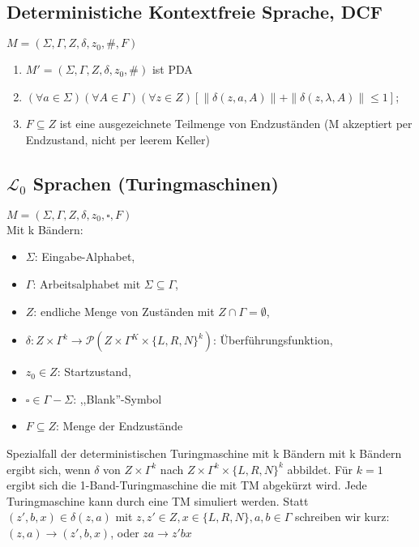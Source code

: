 \documentclass[9pt, a4paper]{article}
\begin{document}
\subsection{Deterministiche Kontextfreie Sprache, DCF}
$M = (\Sigma, \Gamma, Z, \delta, z_0, \#, F)$
\begin{enumerate}
	\item $M' = (\Sigma, \Gamma, Z, \delta, z_0, \#)$ ist PDA
	\item $(\forall a \in \Sigma)(\forall A \in \Gamma)(\forall z \in Z)[\|\delta(z, a, A)\| + \|\delta(z, \lambda, A)\| \le 1]$;
	\item $F \subseteq Z$ ist eine ausgezeichnete Teilmenge von Endzuständen (M akzeptiert per Endzustand, nicht per leerem Keller)
\end{enumerate}

\subsection{$\mathcal{L}_0$ Sprachen (Turingmaschinen)}
$M = (\Sigma, \Gamma, Z, \delta, z_0, \square, F)$\\
Mit k Bändern:
\begin{itemize}
	\item $\Sigma$: Eingabe-Alphabet,
	\item $\Gamma$: Arbeitsalphabet mit $\Sigma \subseteq \Gamma$,
	\item $Z$: endliche Menge von Zuständen mit $Z \cap \Gamma = \emptyset$,
	\item $\delta: Z \times \Gamma^k \to \mathcal{P}(Z \times \Gamma^K \times \{L, R, N\}^k)$: Überführungsfunktion,
	\item $z_0 \in Z$: Startzustand,
	\item $\square \in \Gamma - \Sigma$: ,,Blank''-Symbol
	\item $F \subseteq Z$: Menge der Endzustände
\end{itemize}
Spezialfall der deterministischen Turingmaschine mit k Bändern mit k Bändern ergibt sich, wenn $\delta$ von $Z \times \Gamma^k$ nach $Z \times \Gamma^k \times \{L, R, N\}^k$ abbildet. Für $k = 1$ ergibt sich die 1-Band-Turingmaschine die mit TM abgekürzt wird. Jede Turingmaschine kann durch eine TM simuliert werden.
Statt $(z', b, x)\in \delta(z, a)$ mit $z, z' \in Z, x \in \{L, R, N\}, a, b \in \Gamma$ schreiben wir kurz: $(z, a) \to (z', b, x)$, oder $za \to z'bx$
\end{document}
